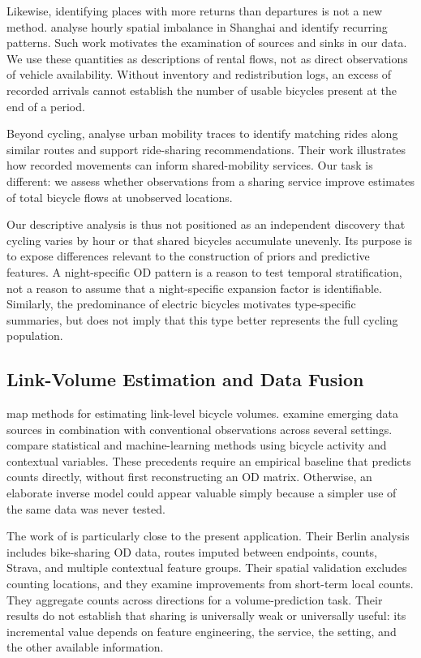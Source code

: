 \documentclass{interact}
\begin{document}
Likewise, identifying places with more returns than departures is not a new method. \citet{song2026} analyse hourly spatial imbalance in Shanghai and identify recurring patterns. Such work motivates the examination of sources and sinks in our data. We use these quantities as descriptions of rental flows, not as direct observations of vehicle availability. Without inventory and redistribution logs, an excess of recorded arrivals cannot establish the number of usable bicycles present at the end of a period.

Beyond cycling, \citet{bicocchi2017rides} analyse urban mobility traces to identify matching rides along similar routes and support ride-sharing recommendations. Their work illustrates how recorded movements can inform shared-mobility services. Our task is different: we assess whether observations from a sharing service improve estimates of total bicycle flows at unobserved locations.

Our descriptive analysis is thus not positioned as an independent discovery that cycling varies by hour or that shared bicycles accumulate unevenly. Its purpose is to expose differences relevant to the construction of priors and predictive features. A night-specific OD pattern is a reason to test temporal stratification, not a reason to assume that a night-specific expansion factor is identifiable. Similarly, the predominance of electric bicycles motivates type-specific summaries, but does not imply that this type better represents the full cycling population.

\subsection{Link-Volume Estimation and Data Fusion}
\citet{bhowmick2023} map methods for estimating link-level bicycle volumes. \citet{kothuri2022} examine emerging data sources in combination with conventional observations across several settings. \citet{miah2023} compare statistical and machine-learning methods using bicycle activity and contextual variables. These precedents require an empirical baseline that predicts counts directly, without first reconstructing an OD matrix. Otherwise, an elaborate inverse model could appear valuable simply because a simpler use of the same data was never tested.

The work of \citet{kaiser2025} is particularly close to the present application. Their Berlin analysis includes bike-sharing OD data, routes imputed between endpoints, counts, Strava, and multiple contextual feature groups. Their spatial validation excludes counting locations, and they examine improvements from short-term local counts. They aggregate counts across directions for a volume-prediction task. Their results do not establish that sharing is universally weak or universally useful: its incremental value depends on feature engineering, the service, the setting, and the other available information.
\end{document}
